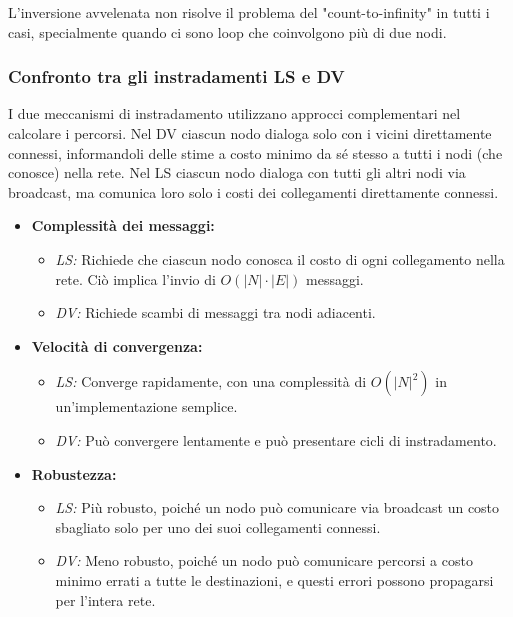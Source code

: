 L'inversione avvelenata non risolve il problema del "count-to-infinity" in tutti i casi, specialmente quando ci sono loop che coinvolgono più di due nodi.

\subsubsection{Confronto tra gli instradamenti LS e DV}
I due meccanismi di instradamento utilizzano approcci complementari nel calcolare i percorsi. Nel DV ciascun nodo dialoga solo con i vicini direttamente connessi, informandoli delle stime a costo minimo da sé stesso a tutti i nodi (che conosce) nella rete. Nel LS ciascun nodo dialoga con tutti gli altri nodi via broadcast, ma comunica loro solo i costi dei collegamenti direttamente connessi.

\begin{itemize}
    \item \textbf{Complessità dei messaggi:}
        \begin{itemize}
            \item \textit{LS:} Richiede che ciascun nodo conosca il costo di ogni collegamento nella rete. Ciò implica l'invio di \(O(|N| \cdot |E|)\) messaggi.
            \item \textit{DV:} Richiede scambi di messaggi tra nodi adiacenti.
        \end{itemize}
    \item \textbf{Velocità di convergenza:}
        \begin{itemize}
            \item \textit{LS:} Converge rapidamente, con una complessità di \(O(|N|^2)\) in un'implementazione semplice.
            \item \textit{DV:} Può convergere lentamente e può presentare cicli di instradamento.
        \end{itemize}
    \item \textbf{Robustezza:}
        \begin{itemize}
            \item \textit{LS:} Più robusto, poiché un nodo può comunicare via broadcast un costo sbagliato solo per uno dei suoi collegamenti connessi.
            \item \textit{DV:} Meno robusto, poiché un nodo può comunicare percorsi a costo minimo errati a tutte le destinazioni, e questi errori possono propagarsi per l'intera rete.
        \end{itemize}
\end{itemize}

